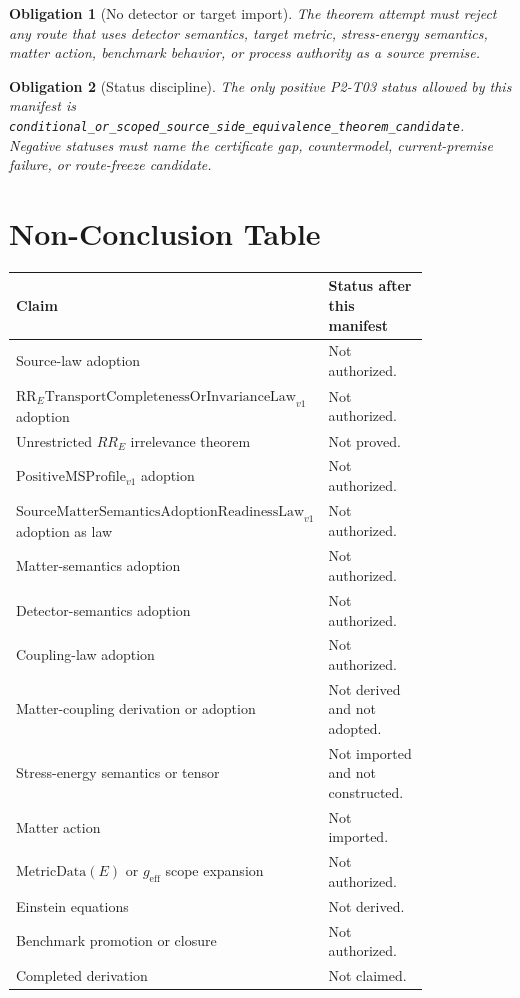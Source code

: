 \documentclass[11pt]{article}
\newcommand{\PositiveMSProfile}{\mathrm{PositiveMSProfile}_{v1}}
\newcommand{\SMSAR}{\mathrm{SourceMatterSemanticsAdoptionReadinessLaw}_{v1}}
\newcommand{\LawRR}{\mathrm{RR}_{E}\mathrm{TransportCompletenessOrInvarianceLaw}_{v1}}
\newcommand{\MetricData}{\mathrm{MetricData}}
\newcommand{\geff}{g_{\mathrm{eff}}}
\newtheorem{obligation}{Obligation}
\begin{document}
\begin{obligation}[No detector or target import]
The theorem attempt must reject any route that uses detector semantics, target
metric, stress-energy semantics, matter action, benchmark behavior, or process
authority as a source premise.
\end{obligation}

\begin{obligation}[Status discipline]
The only positive P2-T03 status allowed by this manifest is
\texttt{conditional\_or\_scoped\_source\_side\_equivalence\_theorem\_candidate}.
Negative statuses must name the certificate gap, countermodel, current-premise
failure, or route-freeze candidate.
\end{obligation}

\section{Non-Conclusion Table}

\begin{longtable}{p{0.34\linewidth}p{0.48\linewidth}}
\toprule
Claim & Status after this manifest \\
\midrule
Source-law adoption & Not authorized. \\
\(\LawRR\) adoption & Not authorized. \\
Unrestricted \(RR_E\) irrelevance theorem & Not proved. \\
\(\PositiveMSProfile\) adoption & Not authorized. \\
\(\SMSAR\) adoption as law & Not authorized. \\
Matter-semantics adoption & Not authorized. \\
Detector-semantics adoption & Not authorized. \\
Coupling-law adoption & Not authorized. \\
Matter-coupling derivation or adoption & Not derived and not adopted. \\
Stress-energy semantics or tensor & Not imported and not constructed. \\
Matter action & Not imported. \\
\(\MetricData(E)\) or \(\geff\) scope expansion & Not authorized. \\
Einstein equations & Not derived. \\
Benchmark promotion or closure & Not authorized. \\
Completed derivation & Not claimed. \\
\bottomrule
\end{longtable}
\end{document}

